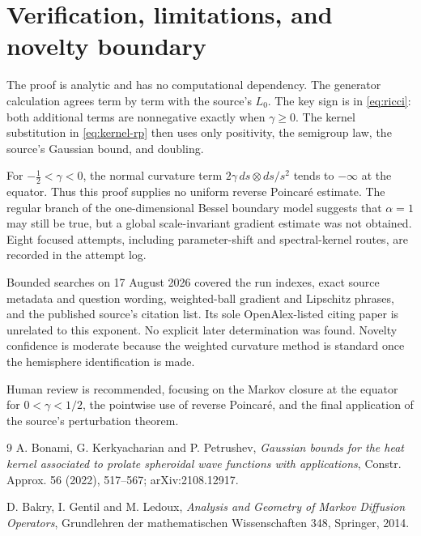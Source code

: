 \documentclass[11pt]{article}
\begin{document}
\section{Verification, limitations, and novelty boundary}

The proof is analytic and has no computational dependency.  The generator
calculation agrees term by term with the source's $L_0$.  The key sign is in
\eqref{eq:ricci}: both additional terms are nonnegative exactly when
$\gamma\ge0$.  The kernel substitution in \eqref{eq:kernel-rp} then uses only
positivity, the semigroup law, the source's Gaussian bound, and doubling.

For $-\tfrac12<\gamma<0$, the normal curvature term
$2\gamma\,ds\otimes ds/s^2$ tends to $-\infty$ at the equator.  Thus this
proof supplies no uniform reverse Poincar\'e estimate.  The regular branch of
the one-dimensional Bessel boundary model suggests that $\alpha=1$ may still
be true, but a global scale-invariant gradient estimate was not obtained.
Eight focused attempts, including parameter-shift and spectral-kernel routes,
are recorded in the attempt log.

Bounded searches on 17 August 2026 covered the run indexes, exact source
metadata and question wording, weighted-ball gradient and Lipschitz phrases,
and the published source's citation list.  Its sole OpenAlex-listed citing
paper is unrelated to this exponent.  No explicit later determination was
found.  Novelty confidence is moderate because the weighted curvature method
is standard once the hemisphere identification is made.

Human review is recommended, focusing on the Markov closure at the equator
for $0<\gamma<1/2$, the pointwise use of reverse Poincar\'e, and the final
application of the source's perturbation theorem.

\begin{thebibliography}{9}
A. Bonami, G. Kerkyacharian and P. Petrushev,
\emph{Gaussian bounds for the heat kernel associated to prolate spheroidal
wave functions with applications},
Constr. Approx. 56 (2022), 517--567; arXiv:2108.12917.

D. Bakry, I. Gentil and M. Ledoux,
\emph{Analysis and Geometry of Markov Diffusion Operators},
Grundlehren der mathematischen Wissenschaften 348, Springer, 2014.
\end{thebibliography}
\end{document}
